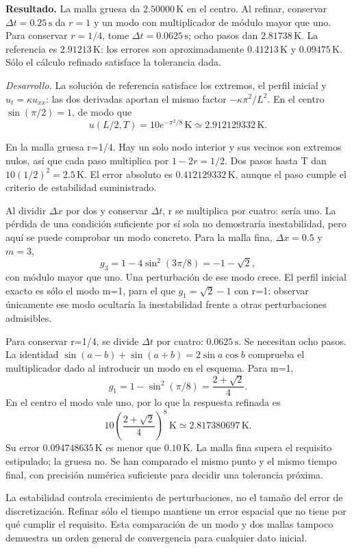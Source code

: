 \noindent\textbf{Resultado.} La malla gruesa da \(2.50000\,\mathrm K\) en el centro. Al refinar, conservar \(\Delta t=0.25\,\mathrm s\) da \(r=1\) y un modo con multiplicador de módulo mayor que uno. Para conservar \(r=1/4\), tome \(\Delta t=0.0625\,\mathrm s\); ocho pasos dan \(2.81738\,\mathrm K\). La referencia es \(2.91213\,\mathrm K\): los errores son aproximadamente \(0.41213\,\mathrm K\) y \(0.09475\,\mathrm K\). Sólo el cálculo refinado satisface la tolerancia dada.

\noindent\textit{Desarrollo.} La solución de referencia satisface los extremos, el perfil inicial y \(u_t=\kappa u_{xx}\): las dos derivadas aportan el mismo factor \(-\kappa\pi^2/L^2\). En el centro \(\sin(\pi/2)=1\), de modo que
\[
u(L/2,T)=10e^{-\pi^2/8}\,\mathrm K\simeq2.912129332\,\mathrm K.
\]

En la malla gruesa r=1/4. Hay un solo nodo interior y sus vecinos son extremos nulos, así que cada paso multiplica por \(1-2r=1/2\). Dos pasos hasta T dan \(10(1/2)^2=2.5\,\mathrm K\). El error absoluto es \(0.412129332\,\mathrm K\), aunque el paso cumple el criterio de estabilidad suministrado.

Al dividir \(\Delta x\) por dos y conservar \(\Delta t\), r se multiplica por cuatro: sería uno. La pérdida de una condición suficiente por sí sola no demostraría inestabilidad, pero aquí se puede comprobar un modo concreto. Para la malla fina, \(\Delta x=0.5\) y \(m=3\),
\[
g_3=1-4\sin^2(3\pi/8)=-1-\sqrt2,
\]
con módulo mayor que uno. Una perturbación de ese modo crece. El perfil inicial exacto es sólo el modo m=1, para el que \(g_1=\sqrt2-1\) con r=1: observar únicamente ese modo ocultaría la inestabilidad frente a otras perturbaciones admisibles.

Para conservar r=1/4, se divide \(\Delta t\) por cuatro: \(0.0625\,\mathrm s\). Se necesitan ocho pasos. La identidad
\(\sin(a-b)+\sin(a+b)=2\sin a\cos b\)
comprueba el multiplicador dado al introducir un modo en el esquema. Para m=1,
\[
g_1=1-\sin^2(\pi/8)=\frac{2+\sqrt2}{4}.
\]
En el centro el modo vale uno, por lo que la respuesta refinada es
\[
10\left(\frac{2+\sqrt2}{4}\right)^8\,\mathrm K
\simeq2.817380697\,\mathrm K.
\]
Su error \(0.094748635\,\mathrm K\) es menor que \(0.10\,\mathrm K\). La malla fina supera el requisito estipulado; la gruesa no. Se han comparado el mismo punto y el mismo tiempo final, con precisión numérica suficiente para decidir una tolerancia próxima.

La estabilidad controla crecimiento de perturbaciones, no el tamaño del error de discretización. Refinar sólo el tiempo mantiene un error espacial que no tiene por qué cumplir el requisito. Esta comparación de un modo y dos mallas tampoco demuestra un orden general de convergencia para cualquier dato inicial.
